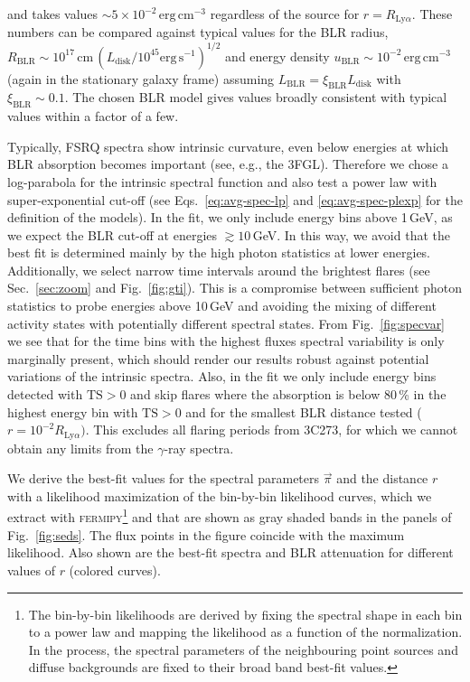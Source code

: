 \documentclass[twocolumn,linenumbers]{aastex62}
\newcommand{\gray}{$\gamma$-ray\xspace}
\newcommand{\todo}[1]{\textbf{\textcolor{red}{#1}}}
\begin{document}
and takes values $\sim 5\times10^{-2}\,\mathrm{erg}\,\mathrm{cm}^{-3}$ regardless of the source for $r = R_{\mathrm{Ly}\alpha}$.
These numbers can be compared against typical values for the BLR radius, $R_\mathrm{BLR} \sim 10^{17}\,\mathrm{cm}\, (L_\mathrm{disk} / 10^{45} \mathrm{erg}\,\mathrm{s}^{-1})^{1/2}$ \citep[e.g.][]{2007ApJ...659..997K,2009ApJ...697..160B} and energy density $u_\mathrm{BLR} \sim 10^{-2}\,\mathrm{erg}\,\mathrm{cm}^{-3} $ (again in the stationary galaxy frame) assuming  $L_\mathrm{BLR} = \xi_\mathrm{BLR} L_\mathrm{disk}$ with $\xi_\mathrm{BLR}\sim 0.1$. 
The chosen BLR model gives values broadly consistent with typical values within a factor of a few.

Typically, FSRQ spectra show intrinsic curvature, even below energies at which BLR absorption becomes important (see, e.g., the 3FGL). Therefore we chose a log-parabola for the intrinsic spectral function and also test a power law with super-exponential cut-off (see Eqs.~\ref{eq:avg-spec-lp} and \ref{eq:avg-spec-plexp} for the definition of the models). 
In the fit, we only include energy bins above 1\,GeV, as we expect the BLR cut-off at energies $\gtrsim 10\,$GeV. In this way, we avoid that the best fit is determined mainly by the high photon statistics at lower energies.
Additionally, we select narrow time intervals around the brightest flares (see Sec.~\ref{sec:zoom} and Fig.~\ref{fig:gti}).
This is a compromise between sufficient photon statistics to probe energies above 10\,GeV and avoiding the mixing of different activity states with potentially different spectral states. 
From Fig.~\ref{fig:specvar} we see that for the time bins with the highest fluxes spectral variability is only marginally present, which should render our results robust against potential variations of the intrinsic spectra. 
Also, in the fit we only include energy bins detected with $\mathrm{TS} > 0$ and skip flares where the absorption is below 80\,\% in the highest energy bin with $\mathrm{TS} > 0$ and for the smallest BLR distance tested ($r = 10^{-2}R_{\mathrm{Ly}\alpha})$. 
This excludes all flaring periods from 3C273, for which we cannot obtain any limits from the \gray spectra.

We derive the best-fit values for the spectral parameters $\vec{\pi}$ and the distance $r$ with a likelihood maximization of the bin-by-bin likelihood curves, which we extract with \textsc{fermipy}\footnote{The bin-by-bin likelihoods are derived by fixing the spectral shape in each bin to a power law and mapping the likelihood as a function of the normalization. In the process, the spectral parameters of the neighbouring point sources and diffuse backgrounds are fixed to their broad band best-fit values.} and that are shown as gray shaded bands in the panels of Fig.~\ref{fig:seds}. 
The flux points in the figure coincide with the maximum likelihood. 
Also shown are the best-fit spectra and BLR attenuation for different values of $r$ (colored curves). 
\end{document}
